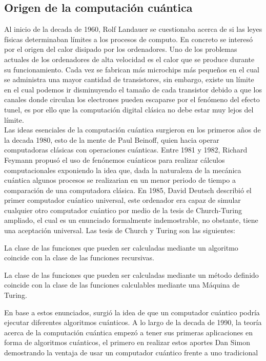 \subsection{Origen de la computación cuántica}
Al inicio de la decada de 1960, Rolf Landauer se cuestionaba acerca de si las leyes físicas determinaban límites a los procesos de computo. En concreto
se interesó por el origen del calor disipado por los ordenadores. Uno de los problemas actuales de los ordenadores de alta velocidad
es el calor que se produce durante su funcionamiento. Cada vez se fabrican más microchips más pequeños en el cual se administra una mayor cantidad de transistores, sin embargo, 
existe un límite en el cual podemos ir disminuyendo el tamaño de cada transistor debido a que los canales donde circulan los electrones pueden escaparse por el fenómeno del 
efecto tunel, es por ello que la computación digital clásica no debe estar muy lejos del límite.\\
Las ideas esenciales de la computación cuántica surgieron en los primeros años de la decada 1980, esto de la mente de Paul Beinoff, quien hacia operar computadoras clásicas
con operaciones cuánticas. Entre 1981 y 1982, Richard Feymann propusó el uso de fenónemos cuánticos para realizar cálculos computacionales exponiendo la idea que, dada la naturaleza
de la mecánica cuántica algunos procesos se realizarian en un menor periodo de tiempo a comparación de una computadora clásica. En 1985, David Deutsch describió el primer computador cuántico
universal, este ordenador era capaz de simular cualquier otro computador cuántico por medio de la tesis de Church-Turing ampliado, el cual es un enunciado formalmente indemostrable, no obstante, tiene una aceptación
universal. Las tesis de Church y Turing son las siguientes:
\begin{tesis}[de Church]
    La clase de las funciones que pueden ser calculadas mediante un algoritmo coincide con la clase de las funciones recursivas.
\end{tesis}
\begin{tesis}[de Turing]
    La clase de las funciones que pueden ser calculadas mediante un método definido coincide con la clase de las funciones calculables mediante una Máquina de Turing.
\end{tesis}
En base a estos enunciados, surgió la idea de que un computador cuántico podría ejecutar diferentes algoritmos cuánticos. A lo largo de la decada de 1990, la teoría acerca de la computación
cuántica empezó a tener sus primeras aplicaciones en forma de algoritmos cuánticos, el primero en realizar estos aportes Dan Simon demostrando la ventaja de usar un computador cuántico frente a uno tradicional
